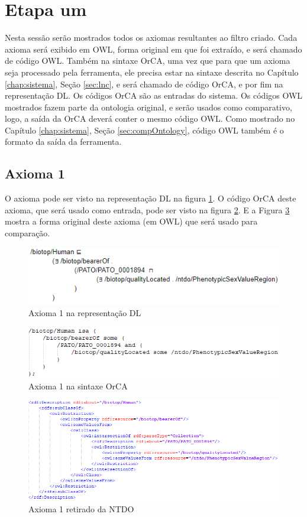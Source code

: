 \documentclass{bcc}
\begin{document}
\section{Etapa um}

Nesta sessão serão mostrados todos os axiomas resultantes ao filtro criado. Cada axioma será exibido em OWL, forma original em que foi extraído, e será chamado de código OWL. Também na sintaxe OrCA, uma vez que para que um axioma seja processado pela ferramenta, ele precisa estar na sintaxe descrita no Capítulo \ref{chap:sistema}, Seção \ref{sec:lnc}, e será chamado de código OrCA, e por fim na representação DL. Os códigos OrCA são as entradas do sistema. Os códigos OWL mostrados fazem parte da ontologia original, e serão usados como comparativo, logo, a saída da OrCA deverá conter o mesmo código OWL. Como mostrado no Capítulo \ref{chap:sistema}, Seção \ref{sec:compOntology}, código OWL também é o formato da saída da ferramenta.

\subsection{Axioma 1}
O axioma pode ser visto na representação DL na figura \ref{fig:axioma1_dl}. O código OrCA deste axioma, que será usado como entrada, pode ser visto na figura \ref{fig:axioma1_orca}. E a Figura \ref{fig:axioma1_o} mostra a forma original deste axioma (em OWL) que será usado para comparação. 

\begin{figure}[H]
\centering
\includegraphics[width=.7\textwidth]{Figuras/axioma1_dl.png}
\caption{Axioma 1 na representação DL} 
\label{fig:axioma1_dl}
\end{figure}

\begin{figure}[H]
\centering
\includegraphics[width=.7\textwidth]{Figuras/axioma1_orca.png}
\caption{Axioma 1 na sintaxe OrCA} 
\label{fig:axioma1_orca}
\end{figure}

\begin{figure}[H]
\centering
\includegraphics[width=.8\textwidth]{Figuras/axioma1_o.png}
\caption{Axioma 1 retirado da NTDO} 
\label{fig:axioma1_o}
\end{figure}
\end{document}
